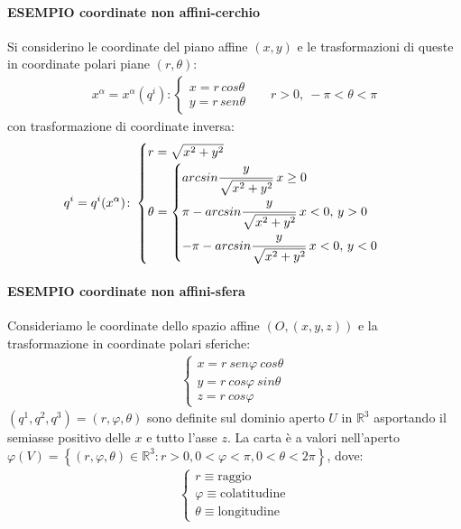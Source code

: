 \documentclass[10pt,a4paper]{book}
\begin{document}
\paragraph{ESEMPIO coordinate non affini-cerchio}
Si considerino le coordinate del piano affine $(x,y)$ e le trasformazioni di queste in coordinate polari piane $(r,\theta)$:
\begin{align*}
x^\alpha=x^\alpha(q^i)\colon\begin{cases}
    x=r\,cos\theta\\
    y=r\,sen\theta
    \end{cases} &&r>0,\: -\pi<\theta<\pi
\end{align*}%
con trasformazione di coordinate inversa:
\begin{align*}
q^i=q^i(x^\alpha)\colon \begin{cases}
r=\sqrt{x^2+y^2}\\
\theta=\begin{cases}
arcsin\cfrac{y}{\sqrt{x^2+y^2}}\;x\ge 0 \\
\pi-arcsin\cfrac{y}{\sqrt{x^2+y^2}}\; x<0,\,y>0\\
-\pi-arcsin\cfrac{y}{\sqrt{x^2+y^2}}\;x<0,\,y<0
\end{cases}
    \end{cases}
\end{align*}
\paragraph{ESEMPIO coordinate non affini-sfera} Consideriamo le coordinate dello spazio affine $(O,(x,y,z))$ e la trasformazione in coordinate polari sferiche:
\begin{align*}
\begin{cases}
x=r\:sen\varphi\:cos\theta\\
y=r\:cos\varphi\:sin\theta\\
 z=r\:cos\varphi
    \end{cases}
\end{align*}
$(q^1,q^2,q^3)=(r,\varphi,\theta)$ sono definite sul dominio aperto $U$ in $\mathbb{R}^3$ asportando il semiasse positivo delle $x$ e tutto l'asse $z$. La carta è a valori nell'aperto $\varphi(V)=\left\{(r,\varphi,\theta)\in \mathbb{R}^3\colon r>0, 0<\varphi<\pi, 0<\theta<2\pi\right\}$, dove:
\begin{align*}
    \begin{cases}
        r\equiv\text{raggio}\\
        \varphi\equiv\text{colatitudine}\\
        \theta\equiv \text{longitudine}
    \end{cases}
\end{align*}
\end{document}
